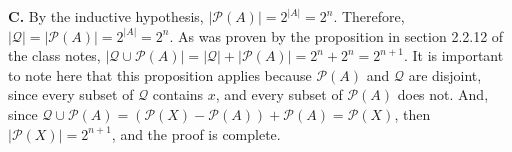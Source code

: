 \documentclass[12pt, letterpaper]{article}
\begin{document}
\textbf{C.}
By the inductive hypothesis, \(\left|\mathcal{P}(A)\right| = 2^{\left|A\right|} = 2^n \). Therefore, \(\left|\mathcal{Q}\right| = \left|\mathcal{P}(A)\right| = 2^{\left|A\right|} = 2^n \). 
As was proven by the proposition in section 2.2.12 of the class notes, \( \left|\mathcal{Q}\cup \mathcal{P}(A)\right| =\left|\mathcal{Q}\right| +  \left|\mathcal{P}(A)\right| = 2^n + 2^n = 2^{n+1}\). It is important to note here that this proposition applies because \(\mathcal{P}(A)\) and \( \mathcal{Q}\) are disjoint, since every subset of \(\mathcal{Q}\) contains \(x\), and every subset of \(\mathcal{P}(A)\) does not. And, since \(\mathcal{Q} \cup \mathcal{P}(A) = (\mathcal{P}(X) - \mathcal{P}(A)) + \mathcal{P}(A) = \mathcal{P}(X)\), then \( \left|\mathcal{P}(X)\right| = 2^{n+1}\), and the proof is complete.
\end{document}
